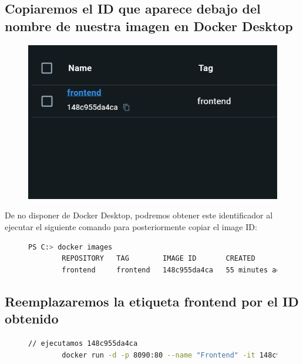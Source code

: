 \documentclass[11pt,a4paper]{article}
\begin{document}
\subsection{Copiaremos el ID que aparece debajo del nombre de nuestra imagen en Docker Desktop}
\begin{figure}[h]
    \centerline{\includegraphics{images/img001.png}}
\end{figure}

\par
De no disponer de Docker Desktop, podremos obtener este identificador
al ejecutar el siguiente comando para posteriormente copiar el image ID:

\begin{figure}[h]
    \begin{lstlisting}[language=Bash]
        PS C:> docker images
        REPOSITORY   TAG        IMAGE ID       CREATED          SIZE
        frontend     frontend   148c955da4ca   55 minutes ago   195MB
    \end{lstlisting}
\end{figure}

\newpage

\subsection{Reemplazaremos la etiqueta frontend por el ID obtenido}

\begin{figure}[h]
    \begin{lstlisting}[language=Bash]
        // ejecutamos 148c955da4ca
        docker run -d -p 8090:80 --name "Frontend" -it 148c955da4ca nginx -g "daemon off;"
    \end{lstlisting}
\end{figure}
\end{document}
